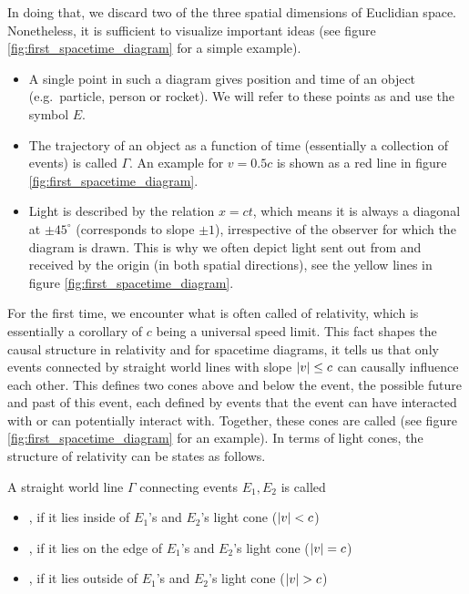 In doing that, we discard two of the three spatial dimensions of Euclidian space. Nonetheless, it is sufficient to visualize important ideas (see figure \ref{fig:first_spacetime_diagram} for a simple example).
\begin{itemize}
	\item A single point in such a diagram gives position and time of an object (e.g.~particle, person or rocket). We will refer to these points as  and use the symbol $E$.


	\item The trajectory of an object as a function of time (essentially a collection of events) is called  $\Gamma$. An example for $v = 0.5 c$ is shown as a red line in figure \ref{fig:first_spacetime_diagram}.


	\item Light is described by the relation $x = ct$, which means it is always a diagonal at $\pm 45^\circ$ (corresponds to slope $\pm 1$), irrespective of the observer for which the diagram is drawn. This is why we often depict light sent out from and received by the origin (in both spatial directions), see the yellow lines in figure \ref{fig:first_spacetime_diagram}.
\end{itemize}

For the first time, we encounter what is often called  of relativity, which is essentially a corollary of $c$ being a universal speed limit. This fact shapes the causal structure in relativity and for spacetime diagrams, it tells us that only events connected by straight world lines with slope $\abs{v} \leq c$ can causally influence each other. This defines two cones above and below the event, the possible future and past of this event, each defined by events that the event can have interacted with or can potentially interact with. Together, these cones are called  (see figure \ref{fig:first_spacetime_diagram} for an example). In terms of light cones, the structure of relativity can be states as follows.
\begin{defi}
	A straight world line $\Gamma$ connecting events $E_1, E_2$ is called
	\begin{itemize}
		\item {}, if it lies inside of $E_1$'s and $E_2$'s light cone ($\abs{v} < c$)
		
		
		\item {}, if it lies on the edge of $E_1$'s and $E_2$'s light cone ($\abs{v} = c$)
		
		
		\item {}, if it lies outside of $E_1$'s and $E_2$'s light cone ($\abs{v} > c$)
	\end{itemize}
\end{defi}




